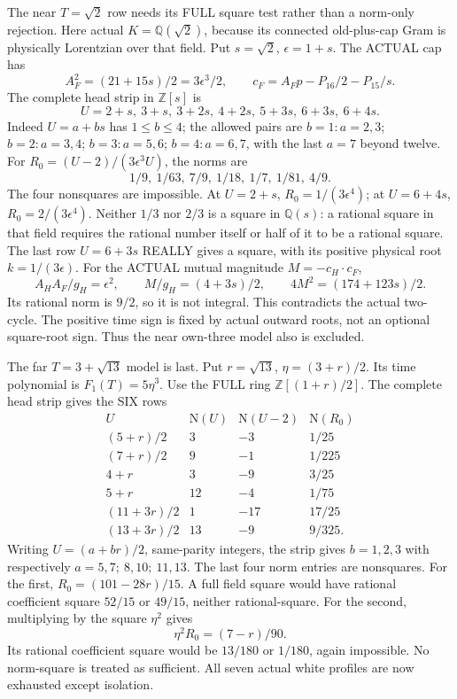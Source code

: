 The near \(T=\sqrt2\) row needs its FULL square
test rather than a norm-only rejection.
Here actual \(K=\mathbb Q(\sqrt2)\), because its
connected old-plus-cap Gram is physically Lorentzian
over that field.
Put \(s=\sqrt2\), \(\epsilon=1+s\).
The ACTUAL cap has
\[
 A_F^2=(21+15s)/2=3\epsilon^3/2,\qquad
 c_F=A_Fp-P_{16}/2-P_{15}/s .
\]
The complete head strip in \(\mathbb Z[s]\) is
\[
         U=2+s,\ 3+s,\ 3+2s,\ 4+2s,\ 5+3s,\ 6+3s,\ 6+4s .
\]
Indeed \(U=a+bs\) has \(1\le b\le4\);
the allowed pairs are
\(b=1:a=2,3\);
\(b=2:a=3,4\);
\(b=3:a=5,6\);
\(b=4:a=6,7\), with the last \(a=7\) beyond twelve.
For \(R_0=(U-2)/(3\epsilon^3U)\), the norms are
\[
                      1/9,\ 1/63,\ 7/9,\ 1/18,\ 1/7,\ 1/81,\ 4/9 .
\]
The four nonsquares are impossible.
At \(U=2+s\), \(R_0=1/(3\epsilon^4)\);
at \(U=6+4s\), \(R_0=2/(3\epsilon^4)\).
Neither \(1/3\) nor \(2/3\) is a square in
\(\mathbb Q(s)\): a rational square in that field
requires the rational number itself or half of
it to be a rational square.
The last row \(U=6+3s\) REALLY gives a square,
with its positive physical root \(k=1/(3\epsilon)\).
For the ACTUAL mutual magnitude \(M=-c_H\cdot c_F\),
\[
 A_HA_F/g_H=\epsilon^2,\qquad
 M/g_H=(4+3s)/2,\qquad
                    4M^2=(174+123s)/2 .
\]
Its rational norm is \(9/2\), so it is not integral.
This contradicts the actual two-cycle.
The positive time sign is fixed by actual outward
roots, not an optional square-root sign.
Thus the near own-three model also is excluded.

The far \(T=3+\sqrt{13}\) model is last.
Put \(r=\sqrt{13}\), \(\eta=(3+r)/2\).
Its time polynomial is \(F_1(T)=5\eta^3\).
Use the FULL ring \(\mathbb Z[(1+r)/2]\).
The complete head strip gives the SIX rows
\[
\begin{array}{c|r|r|c}
 U&\mathrm N(U)&\mathrm N(U-2)&\mathrm N(R_0)\\ \hline
 (5+r)/2&3&-3&1/25\\
 (7+r)/2&9&-1&1/225\\
 4+r&3&-9&3/25\\
 5+r&12&-4&1/75\\
 (11+3r)/2&1&-17&17/25\\
 (13+3r)/2&13&-9&9/325 .
\end{array}
\]
Writing \(U=(a+br)/2\), same-parity integers,
the strip gives \(b=1,2,3\) with respectively
\(a=5,7;\ 8,10;\ 11,13\).
The last four norm entries are nonsquares.
For the first,
\(R_0=(101-28r)/15\).
A full field square would have rational coefficient
square \(52/15\) or \(49/15\), neither rational-square.
For the second, multiplying by the square \(\eta^2\)
gives
\[
                   \eta^2R_0=(7-r)/90 .
\]
Its rational coefficient square would be \(13/180\)
or \(1/180\), again impossible.
No norm-square is treated as sufficient.
All seven actual white profiles are now exhausted
except isolation.

